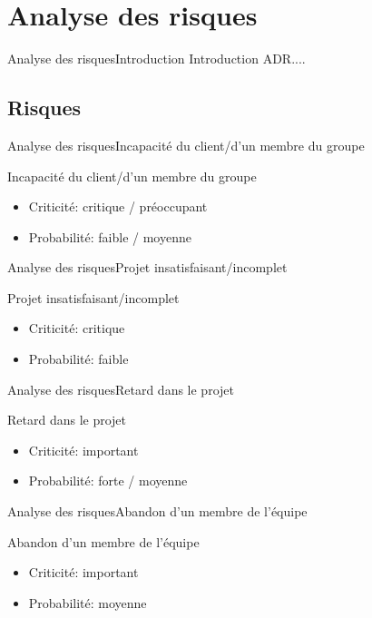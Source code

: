 \section{Analyse des risques}
     \begin{frame}{Analyse des risques}{Introduction}
        Introduction ADR....
     \end{frame}
   \subsection{Risques}
     \begin{frame}{Analyse des risques}{Incapacité du client/d'un membre du groupe}
        \begin{block}{Incapacité du client/d'un membre du groupe}
          \begin{itemize}
            \item Criticité: critique / préoccupant
            \item Probabilité: faible / moyenne
          \end{itemize}
        \end{block}
      \end{frame}
      \begin{frame}{Analyse des risques}{Projet insatisfaisant/incomplet}
        \begin{block}{Projet insatisfaisant/incomplet}
          \begin{itemize}
            \item Criticité: critique
            \item Probabilité: faible
          \end{itemize}
        \end{block}
      \end{frame}
      \begin{frame}{Analyse des risques}{Retard dans le projet}
        \begin{block}{Retard dans le projet}
          \begin{itemize}
            \item Criticité: important
            \item Probabilité: forte / moyenne
          \end{itemize}
        \end{block}
      \end{frame}
      \begin{frame}{Analyse des risques}{Abandon d'un membre de l'équipe}
        \begin{block}{Abandon d'un membre de l'équipe}
          \begin{itemize}
            \item Criticité: important
            \item Probabilité: moyenne
          \end{itemize}
        \end{block}
      \end{frame}
